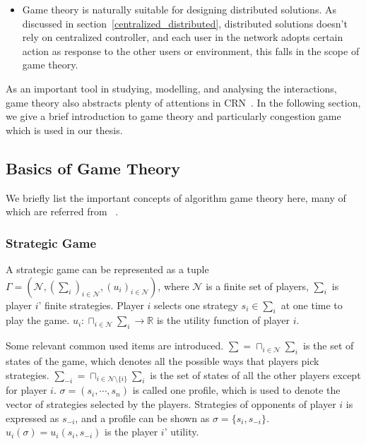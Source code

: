 \begin{itemize}
\item Game theory is naturally suitable for designing distributed solutions.
As discussed in section~\ref{centralized_distributed}, distributed solutions doesn't rely on centralized controller, and each user in the network adopts certain action as response to the other users or environment, this falls in the scope of game theory.
\end{itemize}

As an important tool in studying, modelling, and analysing the interactions, game theory also abstracts plenty of attentions in CRN~\cite{Neel06analysisand, Wang_gtc_crn_survey_2010}.
In the following section, we give a brief introduction to game theory and particularly congestion game which is used in our thesis. 

\subsection{Basics of Game Theory}

We briefly list the important concepts of algorithm game theory here, many of which are referred from ~\cite{agt_book}.


\subsubsection{Strategic Game}

A strategic game can be represented as a tuple $\Gamma = (\mathcal{N}, (\sum_i)_{i \in \mathcal{N}}, (u_i)_{i\in \mathcal{N}})$, where $\mathcal{N}$ is a finite set of players, $\sum_i$ is player $i$' finite strategies.
Player $i$ selects one strategy $s_i\in \sum_i$ at one time to play the game.
$u_i:\sqcap_{i\in \mathcal{N}}\sum_i\rightarrow \mathbb{R} $ is the utility function of player $i$.

Some relevant common used items are introduced.
$\sum=\sqcap_{i\in \mathcal{N}}\sum_i$ is the set of states of the game, which denotes all the possible ways that players pick strategies.
$\sum_{-i}=\sqcap_{i\in \mathcal{N}\setminus \{i\}}\sum_i$ is the set of states of all the other players except for player $i$.
$\sigma=(s_i,\cdots,s_n)$ is called one profile, which is used to denote the vector of strategies selected by the players.
Strategies of opponents of player $i$ is expressed as $s_{-i}$, and a profile can be shown as $\sigma=\{s_i, s_{-i}\}$.
$u_i(\sigma) = u_i(s_i, s_{-i})$ is the player $i$' utility.

